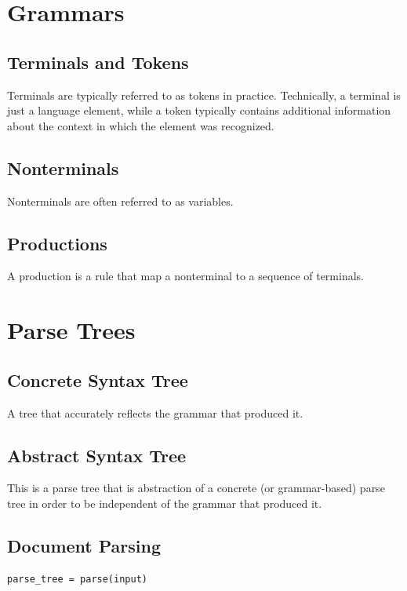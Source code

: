 \documentclass{book}
\begin{document}
\section{Grammars}

\subsection{Terminals and Tokens}
Terminals are typically referred to as tokens in practice. Technically, a
terminal is just a language element, while a token typically contains
additional information about the context in which the element was recognized.

\subsection{Nonterminals}
Nonterminals are often referred to as variables.

\subsection{Productions}
A production is a rule that map a nonterminal 
to a sequence of terminals.

\section{Parse Trees}

\subsection{Concrete Syntax Tree}
A tree that accurately reflects the grammar that produced it.

\subsection{Abstract Syntax Tree}
This is a parse tree that is abstraction of a concrete (or grammar-based) parse tree
in order to be independent of the grammar that produced it.


\subsection{Document Parsing}
\begin{verbatim}
parse_tree = parse(input)
\end{verbatim}
\end{document}
